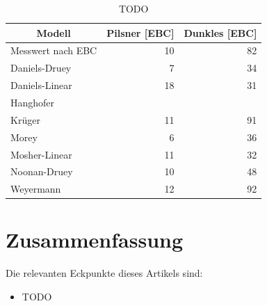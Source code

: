 \documentclass[a4paper,parskip=half]{scrartcl}
\begin{document}
\begin{table}[H]
\centering
\begin{tabular}{lrr}
\toprule
\multicolumn{1}{c}{\textbf{Modell}} & \multicolumn{1}{c}{\textbf{Pilsner [EBC]}} & \multicolumn{1}{c}{\textbf{Dunkles [EBC]}} \\
\midrule
Messwert nach EBC & 10 & 82 \\
Daniels-Druey & 7 & 34 \\
Daniels-Linear & 18 & 31 \\
Hanghofer & & \\
Krüger & 11 & 91 \\
Morey & 6 & 36 \\
Mosher-Linear & 11 & 32 \\
Noonan-Druey & 10 & 48 \\
Weyermann & 12 & 92 \\
\bottomrule
\end{tabular}
\caption{TODO \textcite{KrausWeyermann2021c}}
\label{table:modelcomparepilsner}
\end{table}

\section*{Zusammenfassung}


\parencite{Bruecklmeier2018}
\parencite{Holle2010}

\parencite{Smith2008}
\parencite{Bies2010}
\parencite{Tucker2017}

\parencite{KrausWeyermann2021a}
\parencite{KrausWeyermann2021b}
\parencite{KrausWeyermann2021c}

\parencite{Lange2016}
\parencite{Caro2019}
\parencite{Daniels2012}

Die relevanten Eckpunkte dieses Artikels sind:

\begin{itemize}
\item TODO
\end{itemize}

\printbibliography[title=Quellen]
\end{document}
